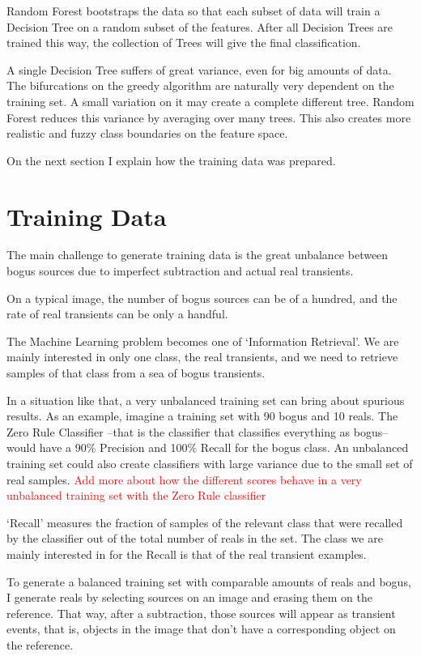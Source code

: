 Random Forest bootstraps the data so that each subset of data will train a Decision Tree on a random subset of the features. After all Decision Trees are trained this way, the collection of Trees will give the final classification.

A single Decision Tree suffers of great variance, even for big amounts of data. The bifurcations on the greedy algorithm are naturally very dependent on the training set. A small variation on it may create a complete different tree. Random Forest reduces this variance by averaging over many trees. This also creates more realistic and fuzzy class boundaries on the feature space.

On the next section I explain how the training data was prepared.

\section{Training Data}

The main challenge to generate training data is the great unbalance between bogus sources due to imperfect subtraction and actual real transients.

On a typical image, the number of bogus sources can be of a hundred, and the rate of real transients can be only a handful. 

The Machine Learning problem becomes one of `Information Retrieval'. We are mainly interested in only one class, the real transients, and we need to retrieve samples of that class from a sea of bogus transients.

In a situation like that, a very unbalanced training set can bring about spurious results. As an example, imagine a training set with 90 bogus and 10 reals. The Zero Rule Classifier --that is the classifier that classifies everything as bogus-- would have a 90\% Precision and 100\% Recall for the bogus class. An unbalanced training set could also create classifiers with large variance due to the small set of real samples. \textcolor{red}{Add more about how the different scores behave in a very unbalanced training set with the Zero Rule classifier}

`Recall' measures the fraction of samples of the relevant class that were recalled by the classifier out of the total number of reals in the set.
The class we are mainly interested in for the Recall is that of the real transient examples.

To generate a balanced training set with comparable amounts of reals and bogus, I generate reals by selecting sources on an image and erasing them on the reference. That way, after a subtraction, those sources will appear as transient events, that is, objects in the image that don't have a corresponding object on the reference.

